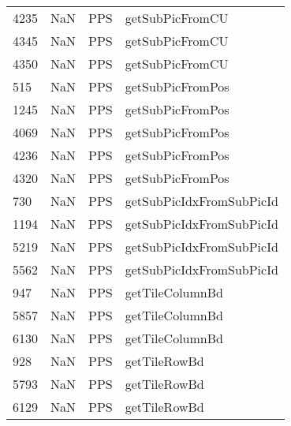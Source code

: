 \begin{tabular}{llll}
4235 &                   NaN &                        PPS &                           getSubPicFromCU \\
4345 &                   NaN &                        PPS &                           getSubPicFromCU \\
4350 &                   NaN &                        PPS &                           getSubPicFromCU \\
515  &                   NaN &                        PPS &                          getSubPicFromPos \\
1245 &                   NaN &                        PPS &                          getSubPicFromPos \\
4069 &                   NaN &                        PPS &                          getSubPicFromPos \\
4236 &                   NaN &                        PPS &                          getSubPicFromPos \\
4320 &                   NaN &                        PPS &                          getSubPicFromPos \\
730  &                   NaN &                        PPS &                  getSubPicIdxFromSubPicId \\
1194 &                   NaN &                        PPS &                  getSubPicIdxFromSubPicId \\
5219 &                   NaN &                        PPS &                  getSubPicIdxFromSubPicId \\
5562 &                   NaN &                        PPS &                  getSubPicIdxFromSubPicId \\
947  &                   NaN &                        PPS &                           getTileColumnBd \\
5857 &                   NaN &                        PPS &                           getTileColumnBd \\
6130 &                   NaN &                        PPS &                           getTileColumnBd \\
928  &                   NaN &                        PPS &                              getTileRowBd \\
5793 &                   NaN &                        PPS &                              getTileRowBd \\
6129 &                   NaN &                        PPS &                              getTileRowBd \\

\end{tabular}
